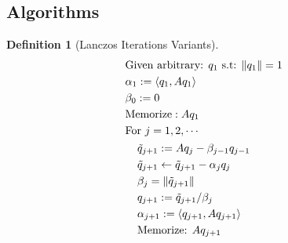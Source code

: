 \documentclass[]{article}
\theoremstyle{definition}
\newtheorem{definition}{Definition}      %
\begin{document}
\begin{appendices}
    \section{Algorithms}
    \begin{definition}[Lanczos Iterations Variants]\label{def:Lanczos Iterations Variants}
        \begin{align}
            \begin{aligned}
                & \text{Given arbitrary: }q_1 \text{ s.t: } \Vert q_1\Vert = 1
                \\
                & \alpha_1 := \langle q_1, Aq_1\rangle
                \\
                & \beta_0 := 0
                \\
                & \text{Memorize}: Aq_1
                \\
                & \text{For }j = 1, 2, \cdots
                \\
                &\hspace{1.1em}
                \begin{aligned}
                    & \tilde{q}_{j + 1} := Aq_j - \beta_{j - 1} q_{j - 1}
                    \\
                    & \tilde{q}_{j + 1} \leftarrow \tilde{q}_{j + 1} - \alpha_jq_j
                    \\
                    & \beta_j = \Vert \tilde{q}_{j + 1}\Vert
                    \\
                    & q_{j + 1}:= \tilde{q}_{j + 1}/\beta_j
                    \\
                    & \alpha_{j + 1} := \left\langle q_{j + 1}, Aq_{j + 1} \right\rangle
                    \\
                    & \text{Memorize: }Aq_{j + 1}
                \end{aligned}
            \end{aligned}
        \end{align}
    \end{definition}
\end{appendices}
\newpage


\printbibliography
            
\end{document}
